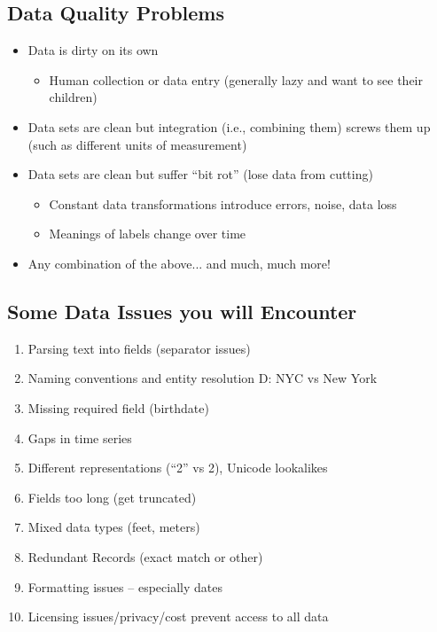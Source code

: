 \documentclass[11pt]{article}
\theoremstyle{definition}
\begin{document}
\subsection{Data Quality Problems}
\begin{itemize}
    \item Data is dirty on its own
    \begin{itemize}
        \item Human collection or data entry (generally lazy and want to see their children)
    \end{itemize}
    \item Data sets are clean but integration (i.e., combining them)
    screws them up (such as different units of measurement)
    \item Data sets are clean but suffer “bit rot” (lose data from cutting)
    \begin{itemize}
        \item Constant data transformations introduce errors, noise, data loss
        \item Meanings of labels change over time
    \end{itemize}
    \item Any combination of the above... and much, much more!
\end{itemize}
\subsection{Some Data Issues you will Encounter}
\begin{enumerate}
    \item Parsing text into fields (separator issues)
    \item Naming conventions and entity resolution D: NYC vs New York
    \item Missing required field (birthdate)
    \item Gaps in time series
    \item Different representations (“2” vs 2), Unicode lookalikes
    \item Fields too long (get truncated)
    \item Mixed data types (feet, meters)
    \item Redundant Records (exact match or other)
    \item Formatting issues – especially dates
    \item Licensing issues/privacy/cost prevent access to all data
\end{enumerate}
\end{document}
